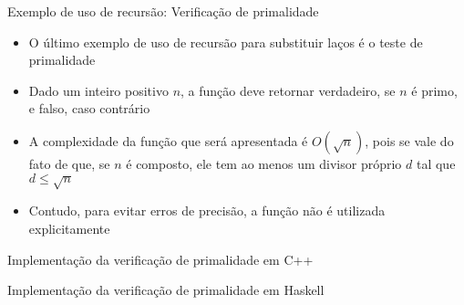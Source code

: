 \begin{frame}[fragile]{Exemplo de uso de recursão: Verificação de primalidade}

    \begin{itemize}
        \item O último exemplo de uso de recursão para substituir laços é o teste de
            primalidade

        \item Dado um inteiro positivo $n$, a função  deve
            retornar verdadeiro, se $n$ é primo, e falso, caso contrário

        \item A complexidade da função que será apresentada é $O(\sqrt{n})$, pois se vale do
            fato de que, se $n$ é composto, ele tem ao menos um divisor próprio $d$ tal que
            $d \leq \sqrt{n}$

        \item Contudo, para evitar erros de precisão, a função  não é 
            utilizada explicitamente
    \end{itemize}

\end{frame}

\begin{frame}[fragile]{Implementação da verificação de primalidade em C++}
\end{frame}

\begin{frame}[fragile]{Implementação da verificação de primalidade em Haskell}
\end{frame}

